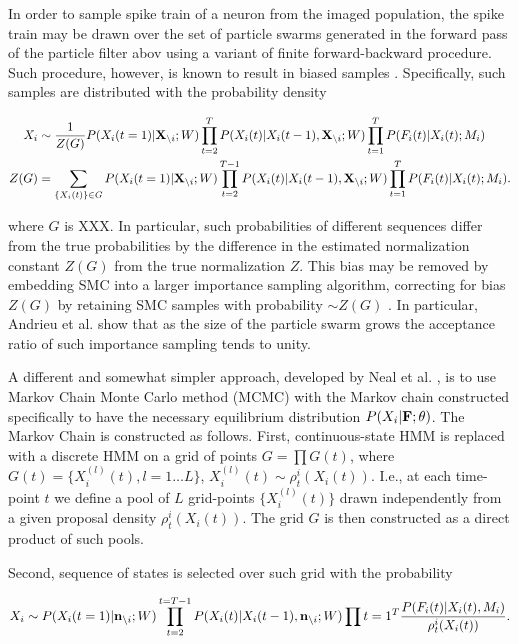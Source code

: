 In order to sample spike train of a neuron from the imaged population, the spike train may be drawn over the set of particle swarms generated in the forward pass of the particle filter abov using a variant of finite forward-backward procedure.  Such procedure, however, is known to result in biased samples \cite{Andrieu2007, NBR03}.
Specifically, such samples are distributed with the probability density

\begin{align}
X_i &\sim \frac{1}{Z(G)} P(X_i(t=1)|{\bf X}_{\backslash i}; W)\prod\limits_{t=2}^{T}P(X_i(t)|X_i(t-1), {\bf X}_{\backslash i}; W) \prod_{t=1}^{T} P(F_i(t)|X_i(t); M_i) \\
Z(G) &= \sum_{\{X_i(t)\}\in G} P(X_i(t=1)|{\bf X}_{\backslash i}; W) \prod_{t=2}^{T-1}P(X_i(t)|X_i(t-1), {\bf X}_{\backslash i}; W) \prod_{t=1}^{T}P(F_i(t)|X_i(t); M_i).
\end{align}

\noindent where $G$ is XXX.  In particular, such probabilities of different sequences differ from the true probabilities by the difference in the estimated normalization constant $Z(G)$ from the true normalization $Z$.  This bias may be removed by embedding SMC into a larger importance sampling algorithm, correcting for bias $Z(G)$ by retaining SMC samples with probability $\sim Z(G)$ \cite{Andrieu2007}. In particular, Andrieu et al. \cite{Andrieu2007} show that as the size of the particle swarm grows the acceptance ratio of such importance sampling tends to unity.

A different and somewhat simpler approach, developed by Neal et al. \cite{NBR03}, is to use Markov Chain Monte Carlo method (MCMC) with the Markov chain constructed specifically to have the necessary equilibrium distribution $P(X_i| {\bf F}; \theta)$. The Markov Chain is constructed as follows. First, continuous-state HMM is replaced with a discrete HMM on a grid of points $G=\prod G(t)$, where $G(t) = \{X_i^{(l)}(t), l=1\ldots L\}$, $X_i^{(l)}(t)\sim \rho^i_t(X_i(t))$. I.e., at each time-point $t$ we define a pool of $L$ grid-points $\{X_i^{(l)}(t)\}$ drawn independently from a given proposal density $\rho^i_t(X_i(t))$. The grid $G$ is then constructed as a direct product of such pools.

Second, sequence of states is selected over such grid with the probability

\begin{equation}\label{eqn:nealprob}
X_i\sim P(X_i(t=1)|{\bf n}_{\backslash i}; W)\prod\limits_{t=2}^{t=T-1}P(X_i(t)|X_i(t-1), {\bf n}_{\backslash i}; W) \prod{t=1}^{T}
\frac{P(F_i(t)|X_i(t), M_i)}{\rho^i_t(X_i(t))}.
\end{equation}


